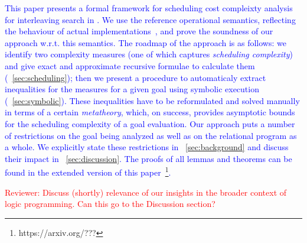 \textcolor{blue}{
This paper presents a formal framework for scheduling cost compleixty analysis for interleaving search in \mK.
We use the reference operational semantics, reflecting the behaviour of actual implementations~\cite{CertifiedSemantics}, and prove the soundness of our approach w.r.t. this semantics.
The roadmap of the approach is as follows: we identify two complexity measures (one of which captures \emph{scheduling complexity}) and give exact and approximate recursive formulae to calculate them (\sectionword~\ref{sec:scheduling}); then we present a procedure to automaticaly extract inequalities for the measures for a given goal using symbolic execution (\sectionword~\ref{sec:symbolic}). 
These inequalities have to be reformulated and solved manually in terms of a certain \emph{metatheory}, which, on success, provides asymptotic bounds for the scheduling complexity of a goal evaluation.
Our approach puts a number of restrictions on the goal being analyzed as well as on the relational program as a whole.
We explicitly state these restrictions in \sectionword~\ref{sec:background} and discuss their impact in \sectionword~\ref{sec:discussion}.
The proofs of all lemmas and theorems can be found in the extended version of this paper~\footnote{https://arxiv.org/???}.}

\textcolor{red}{Reviewer: Discuss (shortly) relevance of our insights in the broader context of logic programming. Can this go to the Discussion section?}

